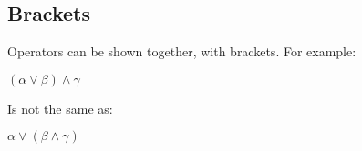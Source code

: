 \subsection{Brackets}

Operators can be shown together, with brackets. For example:

$(\alpha \lor \beta )\land \gamma $

Is not the same as:

$\alpha \lor (\beta \land \gamma )$


